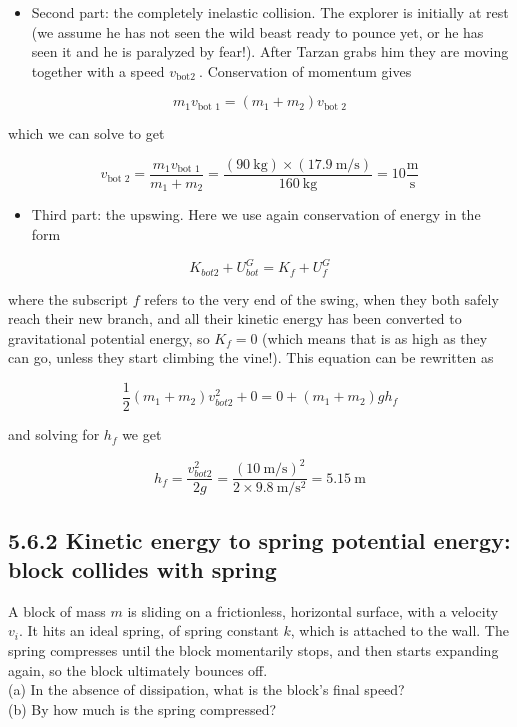 \documentclass[10pt]{article}
\begin{document}
\begin{itemize}
  \item Second part: the completely inelastic collision. The explorer is initially at rest (we assume he has not seen the wild beast ready to pounce yet, or he has seen it and he is paralyzed by fear!). After Tarzan grabs him they are moving together with a speed $v_{\text {bot2 }}$. Conservation of momentum gives
\end{itemize}


\begin{equation*}
m_{1} v_{\text {bot } 1}=\left(m_{1}+m_{2}\right) v_{\text {bot } 2} \tag{5.11}
\end{equation*}


which we can solve to get

$$
v_{\text {bot } 2}=\frac{m_{1} v_{\text {bot } 1}}{m_{1}+m_{2}}=\frac{(90 \mathrm{~kg}) \times(17.9 \mathrm{~m} / \mathrm{s})}{160 \mathrm{~kg}}=10 \frac{\mathrm{m}}{\mathrm{s}}
$$

\begin{itemize}
  \item Third part: the upswing. Here we use again conservation of energy in the form
\end{itemize}


\begin{equation*}
K_{b o t 2}+U_{b o t}^{G}=K_{f}+U_{f}^{G} \tag{5.12}
\end{equation*}


where the subscript $f$ refers to the very end of the swing, when they both safely reach their new branch, and all their kinetic energy has been converted to gravitational potential energy, so $K_{f}=0$ (which means that is as high as they can go, unless they start climbing the vine!). This equation can be rewritten as

$$
\frac{1}{2}\left(m_{1}+m_{2}\right) v_{b o t 2}^{2}+0=0+\left(m_{1}+m_{2}\right) g h_{f}
$$

and solving for $h_{f}$ we get

$$
h_{f}=\frac{v_{b o t 2}^{2}}{2 g}=\frac{(10 \mathrm{~m} / \mathrm{s})^{2}}{2 \times 9.8 \mathrm{~m} / \mathrm{s}^{2}}=5.15 \mathrm{~m}
$$

\subsection*{5.6.2 Kinetic energy to spring potential energy: block collides with spring}
A block of mass $m$ is sliding on a frictionless, horizontal surface, with a velocity $v_{i}$. It hits an ideal spring, of spring constant $k$, which is attached to the wall. The spring compresses until the block momentarily stops, and then starts expanding again, so the block ultimately bounces off.\\
(a) In the absence of dissipation, what is the block's final speed?\\
(b) By how much is the spring compressed?
\end{document}
